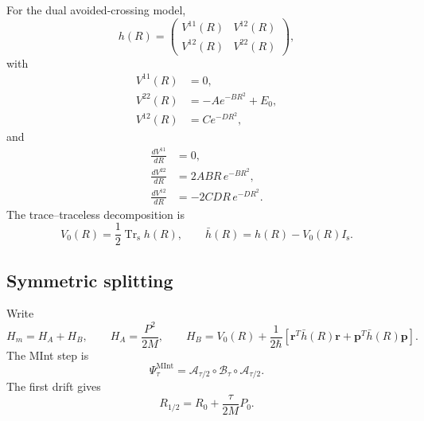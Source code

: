 \documentclass[
  11pt,
  letterpaper,
  onehalfspacing,
  normalmargins,
  equalmargins,
  oneside
]{ut-thesis}
\begin{document}
For the dual avoided-crossing model,
\begin{equation}
h(R)
=
\begin{pmatrix}
V^{11}(R) & V^{12}(R)\\
V^{12}(R) & V^{22}(R)
\end{pmatrix},
\label{appeq:tully-diabatic-hamiltonian}
\end{equation}
with
\begin{align}
V^{11}(R)&=0,
\\
V^{22}(R)&=-A e^{-BR^2}+E_0,
\\
V^{12}(R)&=C e^{-DR^2},
\end{align}
and
\begin{align}
\frac{dV^{11}}{dR}&=0,
\\
\frac{dV^{22}}{dR}
&=
2ABR\,e^{-BR^2},
\\
\frac{dV^{12}}{dR}
&=
-2CDR\,e^{-DR^2}.
\end{align}
The trace--traceless decomposition is
\begin{equation}
V_0(R)
=
\frac{1}{2}
\operatorname{Tr}_{\mathrm s}h(R),
\qquad
\bar h(R)
=
h(R)-V_0(R)I_{\mathrm s}.
\label{appeq:tully-trace-traceless}
\end{equation}

\subsection{Symmetric splitting}
\label{appsubsec:mint-splitting}

Write
\[
H_m=H_A+H_B,
\qquad
H_A=\frac{P^2}{2M},
\qquad
H_B
=
V_0(R)
+
\frac{1}{2\hbar}
\left[
\mathbf r^T\bar h(R)\mathbf r
+
\mathbf p^T\bar h(R)\mathbf p
\right].
\]
The MInt step is
\begin{equation}
\Psi_\tau^{\mathrm{MInt}}
=
\mathcal A_{\tau/2}
\circ
\mathcal B_\tau
\circ
\mathcal A_{\tau/2}.
\label{appeq:mint-composition}
\end{equation}
The first drift gives
\begin{equation}
R_{1/2}
=
R_0+\frac{\tau}{2M}P_0.
\label{appeq:mint-first-drift}
\end{equation}
\end{document}
